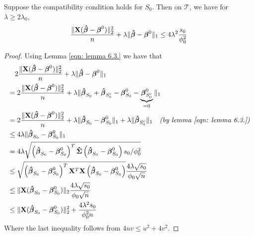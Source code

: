 \begin{theorem}[Theorem 6.1.]
    Suppose the compatibility condition holds for $S_{0}$. Then on $\mathscr{T}$, we have for $\lambda \geq 2 \lambda_{0}$,
    $$
        \frac{\|\mathbf{X}(\boldsymbol{\hat{\beta}}-\boldsymbol{\beta}^{0})\|_{2}^{2}}{n}+\lambda\|\boldsymbol{\hat{\beta}}-\boldsymbol{\beta}^{0}\|_{1} \leq 4 \lambda^{2} \frac{s_{0}}{\phi_{0}^{2}}
    $$
\end{theorem}
\begin{proof}
    Using Lemma \ref{eqn: lemma 6.3.} we have that
    \begin{align*}
         & \quad 2 \frac{\|\mathbf{X}(\boldsymbol{\hat{\beta}}-\boldsymbol{\beta}^{0})\|_{2}^{2}}{n} + \lambda\|\boldsymbol{\hat{\beta}}-\boldsymbol{\beta}^{0}\|_{1}                                                                                                    \\
         & = 2 \frac{\|\mathbf{X}(\boldsymbol{\hat{\beta}}-\boldsymbol{\beta}^{0})\|_{2}^{2}}{n} + \lambda \| \boldsymbol{\hat{\beta}}_{S_0} + \boldsymbol{\hat{\beta}}_{S_{0}^{c}} - \boldsymbol{\beta}^{0}_{S_0} - \underbrace{\boldsymbol{\beta}^{0}_{S_0^c}}_{=0} \|_{1}                            \\
         & = 2 \frac{\|\mathbf{X}(\boldsymbol{\hat{\beta}}-\boldsymbol{\beta}^{0})\|_{2}^{2}}{n} + \lambda \| \boldsymbol{\hat{\beta}}_{S_0} - \boldsymbol{\beta}^{0}_{S_0} \|_{1} + \lambda \| \boldsymbol{\hat{\beta}}_{S_{0}^{c}} \|_1 \quad \textit{(by lemma \ref{eqn: lemma 6.3.})} \\
         & \leq 4 \lambda \|\boldsymbol{\hat{\beta}}_{S_{0}} - \boldsymbol{\beta}_{S_{0}}^{0} \|_{1}                                                                                                                                      \\
         & = 4 \lambda \sqrt{\left( \boldsymbol{\hat{\beta}}_{S_{0}} - \boldsymbol{\beta}_{S_{0}}^{0} \right)^{T} \boldsymbol{\hat{\Sigma}} \left( \boldsymbol{\hat{\beta}}_{S_{0}} - \boldsymbol{\beta}_{S_{0}}^{0}  \right) s_{0} / \phi_{0}^{2}}                                     \\
         & \leq \sqrt{\left( \boldsymbol{\hat{\beta}}_{S_{0}} - \boldsymbol{\beta}_{S_{0}}^{0} \right)^{T} \mathbf{X}^T \mathbf{X} \left( \boldsymbol{\hat{\beta}}_{S_{0}} - \boldsymbol{\beta}_{S_{0}}^{0}  \right)} \frac{4 \lambda \sqrt{s_{0}}}{\phi_{0} \sqrt{n}}                   \\
         & \leq \| \mathbf{X} ( \boldsymbol{\hat{\beta}}_{S_{0}} - \boldsymbol{\beta}_{S_{0}}^{0} ) \|_2 \frac{4 \lambda \sqrt{s_{0}}}{\phi_{0} \sqrt{n}}                                                                                         \\
         & \leq \| \mathbf{X} ( \boldsymbol{\hat{\beta}}_{S_{0}} - \boldsymbol{\beta}_{S_{0}}^{0} ) \|^2_2 + \frac{4 \lambda^2 s_{0}}{\phi^2_{0} n}                                                                                               \\
    \end{align*}
    Where the last inequality follows from $4uv \leq u^2 + 4v^2$.
\end{proof}


